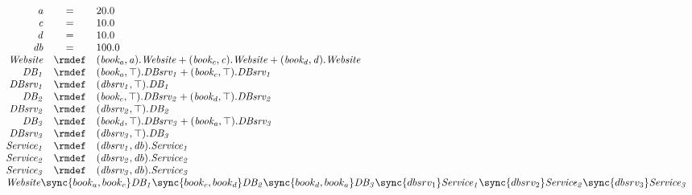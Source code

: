 \begin{displaymath}
	\begin{array}{rcl}
		\mathit{a} & = & 20.0\\
		\mathit{c} & = & 10.0\\
		\mathit{d} & = & 10.0\\
		\mathit{db} & = & 100.0\\
[0.0ex]		\mathit{Website} & \rmdef & (\mathit{book_a},\mathit{a}).\mathit{Website}+(\mathit{book_c},\mathit{c}).\mathit{Website}+(\mathit{book_d},\mathit{d}).\mathit{Website}\\
		\mathit{DB_1} & \rmdef & (\mathit{book_a},\top).\mathit{DBsrv_1}+(\mathit{book_c},\top).\mathit{DBsrv_1}\\
		\mathit{DBsrv_1} & \rmdef & (\mathit{dbsrv_1},\top).\mathit{DB_1}\\
		\mathit{DB_2} & \rmdef & (\mathit{book_c},\top).\mathit{DBsrv_2}+(\mathit{book_d},\top).\mathit{DBsrv_2}\\
		\mathit{DBsrv_2} & \rmdef & (\mathit{dbsrv_2},\top).\mathit{DB_2}\\
		\mathit{DB_3} & \rmdef & (\mathit{book_d},\top).\mathit{DBsrv_3}+(\mathit{book_a},\top).\mathit{DBsrv_3}\\
		\mathit{DBsrv_3} & \rmdef & (\mathit{dbsrv_3},\top).\mathit{DB_3}\\
		\mathit{Service_1} & \rmdef & (\mathit{dbsrv_1},\mathit{db}).\mathit{Service_1}\\
		\mathit{Service_2} & \rmdef & (\mathit{dbsrv_2},\mathit{db}).\mathit{Service_2}\\
		\mathit{Service_3} & \rmdef & (\mathit{dbsrv_3},\mathit{db}).\mathit{Service_3}\\
[0.0ex]		\multicolumn{3}{l}{\mathit{Website}\sync{book_a,book_c}\mathit{DB_1}\sync{book_c,book_d}\mathit{DB_2}\sync{book_d,book_a}\mathit{DB_3}\sync{dbsrv_1}\mathit{Service_1}\sync{dbsrv_2}\mathit{Service_2}\sync{dbsrv_3}\mathit{Service_3}}\\
[0.0ex]	\end{array}
\end{displaymath}
